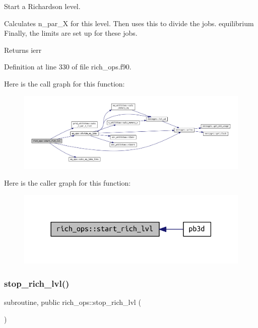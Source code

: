 Start a Richardson level. 

Calculates {\ttfamily n\+\_\+par\+\_\+X} for this level. Then uses this to divide the jobs. equilibrium Finally, the limits are set up for these jobs.

\begin{DoxyReturn}{Returns}
ierr 
\end{DoxyReturn}


Definition at line 330 of file rich\+\_\+ops.\+f90.

Here is the call graph for this function\+:\nopagebreak
\begin{figure}[H]
\begin{center}
\leavevmode
\includegraphics[width=350pt]{namespacerich__ops_a97206a15127960366fcb41d6889cb3b5_cgraph}
\end{center}
\end{figure}
Here is the caller graph for this function\+:\nopagebreak
\begin{figure}[H]
\begin{center}
\leavevmode
\includegraphics[width=318pt]{namespacerich__ops_a97206a15127960366fcb41d6889cb3b5_icgraph}
\end{center}
\end{figure}
\mbox{\label{namespacerich__ops_a0cce16b835e18b025d366a038b22efe1}} 
\subsubsection{\texorpdfstring{stop\+\_\+rich\+\_\+lvl()}{stop\_rich\_lvl()}}
{\footnotesize\ttfamily subroutine, public rich\+\_\+ops\+::stop\+\_\+rich\+\_\+lvl (\begin{DoxyParamCaption}{ }\end{DoxyParamCaption})}



